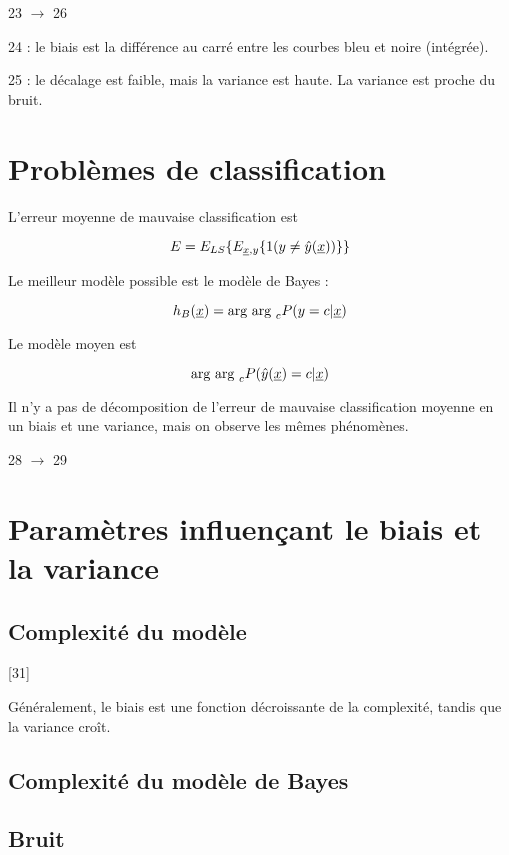 	23 $\rightarrow$ 26
	
	24 : le biais est la différence au carré entre les courbes bleu et noire (intégrée).
	
	25 : le décalage est faible, mais la variance est haute. La variance est proche du bruit.
	
	
	\section{Problèmes de classification}
	
	L'erreur moyenne de mauvaise classification est
	
	$$E = E_{LS}\{E_{\underline{x}, y}\{1 (y \neq \hat{y}(\underline{x}))\}\}$$
	
	Le meilleur modèle possible est le modèle de Bayes :
	
	$$h_B(\underline{x}) = \text{arg } \text{arg }_c P(y = c \vert \underline{x})$$
	
	Le modèle moyen est
	
	$$\text{arg } \text{arg }_c P(\hat{y}(\underline{x}) = c \vert \underline{x})$$
	
	Il n'y a pas de décomposition de l'erreur de mauvaise classification moyenne en un biais et une variance, mais on observe les mêmes phénomènes.
	
	28 $\rightarrow$ 29
	
	\section{Paramètres influençant le biais et la variance}
	
		\subsection{Complexité du modèle}
		[31]
		
		
		Généralement, le biais est une fonction décroissante de la complexité, tandis que la variance croît.
		
		\subsection{Complexité du modèle de Bayes}
		
		
		\subsection{Bruit}
		
